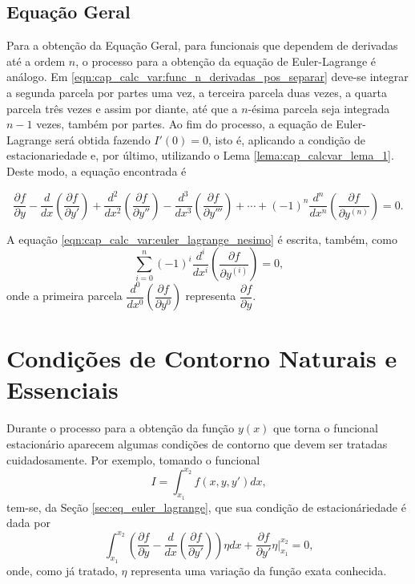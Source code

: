 \documentclass[
	12pt,				%
	openright,			%
    twoside,			%
	a4paper,			%
	english,			%
	french,				%
	spanish,			%
	brazil				%
	]{abntex2}
\numberwithin{lema}{chapter}
\numberwithin{teorema}{chapter}
\numberwithin{definicao}{chapter}
\numberwithin{exemplo}{chapter}
\numberwithin{figure}{chapter}
\begin{document}
\subsection{Equação Geral}



Para a obtenção da Equação Geral, para funcionais que dependem de derivadas até a ordem $n$, o processo para a obtenção da equação de Euler-Lagrange é análogo. Em \eqref{eqn:cap_calc_var:func_n_derivadas_pos_separar} deve-se integrar a segunda parcela por partes uma vez, a terceira parcela duas vezes, a quarta parcela três vezes e assim por diante, até que a $n$-ésima parcela seja integrada $n-1$ vezes, também por partes. Ao fim do processo, a equação de Euler-Lagrange será obtida fazendo $I'(0)=0$, isto é, aplicando a condição de estacionariedade e, por último, utilizando o Lema \ref{lema:cap_calcvar_lema_1}. Deste modo, a equação encontrada é

\begin{equation}
	\label{eqn:cap_calc_var:euler_lagrange_nesimo}
	\frac{\partial f}{\partial y}
	- \frac{d}{dx}\left ( \frac{\partial f}{\partial y'} \right )
	+ \frac{d^2}{dx^2}\left ( \frac{\partial f}{\partial y''} \right )
	- \frac{d^3}{dx^3}\left ( \frac{\partial f}{\partial y'''} \right )
	+ \cdots
	+ (-1)^n \frac{d^n}{dx^n}\left (\frac{\partial f}{\partial y^{(n)}} \right )
	= 0
	\text{.}
\end{equation}

A equação \eqref{eqn:cap_calc_var:euler_lagrange_nesimo} é escrita, também, como
$$
	\sum_{i=0}^n (-1)^i\frac{d^i}{dx^i}\left (
		\frac{\partial f}{\partial y^{(i)}}
	\right )
	= 0
	\text{,}
$$
onde a primeira parcela $\dfrac{d^0}{dx^0} \left ( \dfrac{\partial f}{\partial y^0} \right )$ representa $\dfrac{\partial f}{\partial y}$.

\section{Condições de Contorno Naturais e Essenciais}
\label{sec:cond_contorno}

Durante o processo para a obtenção da função $y(x)$ que torna o funcional estacionário aparecem algumas condições de contorno que devem ser tratadas cuidadosamente. Por exemplo, tomando o funcional
$$
	I=\int_{x_1}^{x_2} f(x, y, y')dx
	\text{,}
$$
tem-se, da Seção \ref{sec:eq_euler_lagrange}, que sua condição de estacionáriedade é dada por
\begin{equation}
	\label{eqn:cap_calc_var:cond_boundary}
	\int_{x_1}^{x_2} \left (
		\frac{\partial f}{\partial y}
		-
		\frac{d}{dx} \left (
			\frac{\partial f}{\partial y'}
		\right )
	\right ) \eta dx
	+
	\frac{\partial f}{\partial y'}\eta \Big |_{x_1}^{x_2} = 0
	\text{,}
\end{equation}
onde, como já tratado, $\eta$ representa uma variação da função exata conhecida.
\end{document}
